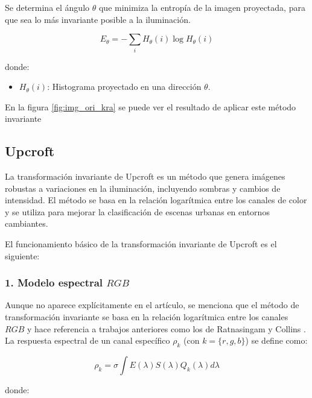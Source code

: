 Se determina el ángulo $\theta$ que minimiza la entropía de la imagen proyectada, para que sea lo más invariante posible a la iluminación.

$$E_{\theta } =-\sum_i H_{\theta } (i)\log H_{\theta } (i)$$

donde:

\begin{itemize}
\setlength{\itemsep}{-1ex}
   \item{\begin{flushleft} $H_{\theta } (i)$: Histograma proyectado en una dirección $\theta$. \end{flushleft}}
\end{itemize}

En la figura \ref{fig:img_ori_kra} se puede ver el resultado de aplicar este método invariante

\subsection{Upcroft}\label{upcroft}

La transformación invariante de Upcroft \cite{upcroft2014} es un método que genera imágenes robustas a variaciones en la iluminación, incluyendo sombras y cambios de intensidad. El método se basa en la relación logarítmica entre los canales de color y se utiliza para mejorar la clasificación de escenas urbanas en entornos cambiantes.

El funcionamiento básico de la transformación invariante de Upcroft es el siguiente:

\subsubsection{1. Modelo espectral $RGB$}

Aunque no aparece explícitamente en el artículo, se menciona que el método de transformación invariante se basa en la relación logarítmica entre los canales $RGB$ y hace referencia a trabajos anteriores como los de Ratnasingam y Collins \cite{Ratnasingam&Collins}. La respuesta espectral de un canal específico $\rho_k$ (con $k=\{r,g,b\}$) se define como:

$$\rho_k =\sigma \int E(\lambda )S(\lambda )Q_k (\lambda )d\lambda$$

donde:

